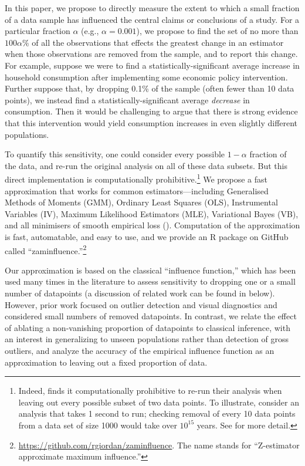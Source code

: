 In this paper, we propose to directly measure the extent to which a small
fraction of a data sample has influenced the central claims or conclusions of a
study. For a particular fraction $\alpha$ (e.g., $\alpha = 0.001$), we propose
to find the set of no more than $100 \alpha \%$ of all the observations that
effects the greatest change in an estimator when those observations are removed
from the sample, and to report this change. For example, suppose we were to
find a statistically-significant average increase in household consumption after
implementing some economic policy intervention. Further suppose that, by
dropping 0.1\% of the sample (often fewer than 10 data points), we instead find
a statistically-significant average \emph{decrease} in consumption. Then it
would be challenging to argue that there is strong evidence that this
intervention would yield consumption increases in even slightly different
populations.

To quantify this sensitivity, one could consider every possible $1-\alpha$
fraction of the data, and re-run the original analysis on all of these data
subsets. But this direct implementation is computationally
prohibitive.\footnote{Indeed, \citet{young2019consistency} finds it
computationally prohibitive to re-run their analysis when leaving out every
possible subset of two data points. To illustrate, consider an analysis that
takes 1 second to run; checking removal of every 10 data points from a data set
of size 1000 would take over $10^{15}$ years. See  for more detail.} We
propose a fast approximation that works for common estimators---including
Generalised Methods of Moments (GMM), Ordinary Least Squares (OLS), Instrumental
Variables (IV), Maximum Likelihood Estimators (MLE), Variational Bayes (VB), and
all minimisers of smooth empirical loss ().
Computation of the approximation is fast, automatable, and easy to use, and we
provide an \textsf{R} package on GitHub called
``zaminfluence.''\footnote{\url{https://github.com/rgiordan/zaminfluence}. The
name stands for ``Z-estimator approximate maximum influence.'' }

Our approximation is based on the classical ``influence function,'' which has
been used many times in the literature to assess sensitivity to dropping one or
a small number of datapoints (a discussion of related work can be found in
 below).  However, prior work focused on outlier detection
and visual diagnostics and considered small numbers of removed datapoints.  In
contrast, we relate the effect of ablating a non-vanishing proportion of
datapoints to classical inference, with an interest in generalizing to unseen
populations rather than detection of gross outliers, and analyze the accuracy of
the empirical influence function as an approximation to leaving out a fixed
proportion of data.

